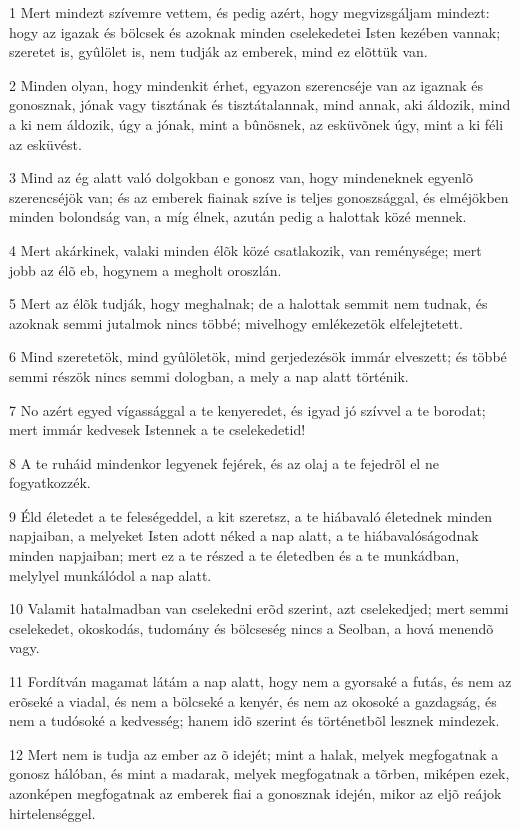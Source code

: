 \par 1 Mert mindezt szívemre vettem, és pedig azért, hogy megvizsgáljam mindezt: hogy az igazak és bölcsek és azoknak minden cselekedetei Isten kezében vannak; szeretet is, gyûlölet is, nem tudják az emberek, mind ez elõttük van.
\par 2 Minden olyan, hogy mindenkit érhet, egyazon szerencséje van az igaznak és gonosznak, jónak vagy tisztának és tisztátalannak, mind annak, aki áldozik, mind a ki nem áldozik, úgy a jónak, mint a bûnösnek, az esküvõnek úgy, mint a ki féli az esküvést.
\par 3 Mind az ég alatt való dolgokban e gonosz van, hogy mindeneknek egyenlõ szerencséjök van; és az emberek fiainak szíve is teljes gonoszsággal, és elméjökben minden bolondság van, a míg élnek, azután pedig a halottak közé mennek.
\par 4 Mert akárkinek, valaki minden élõk közé csatlakozik, van reménysége; mert jobb az élõ eb, hogynem a megholt oroszlán.
\par 5 Mert az élõk tudják, hogy meghalnak; de a halottak semmit nem tudnak, és azoknak semmi jutalmok nincs többé; mivelhogy emlékezetök elfelejtetett.
\par 6 Mind szeretetök, mind gyûlöletök, mind gerjedezésök immár elveszett; és többé semmi részök nincs semmi dologban, a mely a nap alatt történik.
\par 7 No azért egyed vígassággal a te kenyeredet, és igyad jó szívvel a te borodat; mert immár kedvesek Istennek a te cselekedetid!
\par 8 A te ruháid mindenkor legyenek fejérek, és az olaj a te fejedrõl el ne fogyatkozzék.
\par 9 Éld életedet a te feleségeddel, a kit szeretsz, a te hiábavaló életednek minden napjaiban, a melyeket Isten adott néked a nap alatt, a te hiábavalóságodnak minden napjaiban; mert ez a te részed a te életedben és a te munkádban, melylyel munkálódol a nap alatt.
\par 10 Valamit hatalmadban van cselekedni erõd szerint, azt cselekedjed; mert semmi cselekedet, okoskodás, tudomány és bölcseség nincs a Seolban, a hová menendõ vagy.
\par 11 Fordítván magamat látám a nap alatt, hogy nem a gyorsaké a futás, és nem az erõseké a viadal, és nem a bölcseké a kenyér, és nem az okosoké a gazdagság, és nem a tudósoké a kedvesség; hanem idõ szerint és történetbõl lesznek mindezek.
\par 12 Mert nem is tudja az ember az õ idejét; mint a halak, melyek megfogatnak a gonosz hálóban, és mint a madarak, melyek megfogatnak a tõrben, miképen ezek, azonképen megfogatnak az emberek fiai a gonosznak idején, mikor az eljõ reájok hirtelenséggel.
